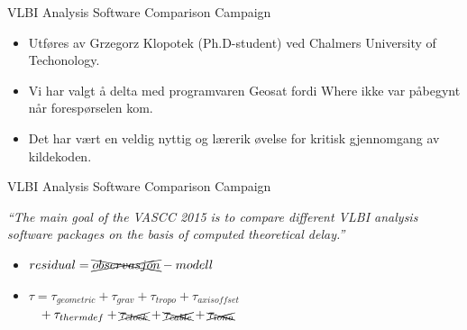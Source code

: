 \documentclass[12pt,table,t]{beamer}
\begin{document}
\begin{frame}{VLBI Analysis Software Comparison Campaign}

  \begin{itemize}
  \item Utføres av Grzegorz Klopotek (Ph.D-student) ved Chalmers University of Techonology.
  \item Vi har valgt å delta med programvaren Geosat fordi Where ikke var påbegynt når forespørselen kom.
  \item Det har vært en veldig nyttig og lærerik øvelse for kritisk gjennomgang av kildekoden.
  \end{itemize}
\end{frame}


\begin{frame}{VLBI Analysis Software Comparison Campaign}

  {\itshape ``The main goal of the VASCC 2015 is to compare different VLBI analysis software packages on the basis of
    computed theoretical delay.''}

  \begin{itemize}
  \item $residual = \xcancel{observasjon} - modell$
  \item $\tau = \tau _{geometric} + \tau _{grav} + \tau _{tropo} + \tau _{axisoffset}$ \\
    $\phantom{\tau\, } + \tau _{thermdef} + \xcancel{\tau _{clock}} + \xcancel{\tau _{cable}} + \xcancel{\tau _{iono}}$
  \end{itemize}
\end{frame}
\end{document}

